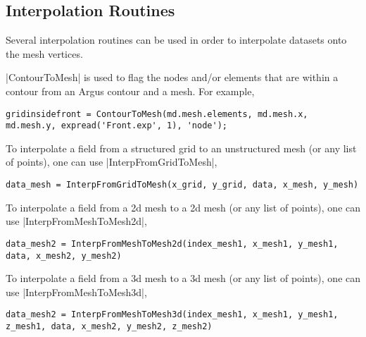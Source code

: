 
\subsection{Interpolation Routines} \label{sec:using-issm-capabilities-interpolation}
Several interpolation routines can be used in order to interpolate datasets onto the mesh vertices.

\lstinlinebg|ContourToMesh| is used to flag the nodes and/or elements that are within a contour from an Argus contour and a mesh. For example,
\begin{lstlisting}
gridinsidefront = ContourToMesh(md.mesh.elements, md.mesh.x, md.mesh.y, expread('Front.exp', 1), 'node');
\end{lstlisting}

To interpolate a field from a structured grid to an unstructured mesh (or any list of points), one can use \lstinlinebg|InterpFromGridToMesh|,
\begin{lstlisting}
data_mesh = InterpFromGridToMesh(x_grid, y_grid, data, x_mesh, y_mesh)
\end{lstlisting}

To interpolate a field from a 2d mesh to a 2d mesh (or any list of points), one can use \lstinlinebg|InterpFromMeshToMesh2d|,
\begin{lstlisting}
data_mesh2 = InterpFromMeshToMesh2d(index_mesh1, x_mesh1, y_mesh1, data, x_mesh2, y_mesh2)
\end{lstlisting}

To interpolate a field from a 3d mesh to a 3d mesh (or any list of points), one can use \lstinlinebg|InterpFromMeshToMesh3d|,
\begin{lstlisting}
data_mesh2 = InterpFromMeshToMesh3d(index_mesh1, x_mesh1, y_mesh1, z_mesh1, data, x_mesh2, y_mesh2, z_mesh2)
\end{lstlisting}

\clearpage %
